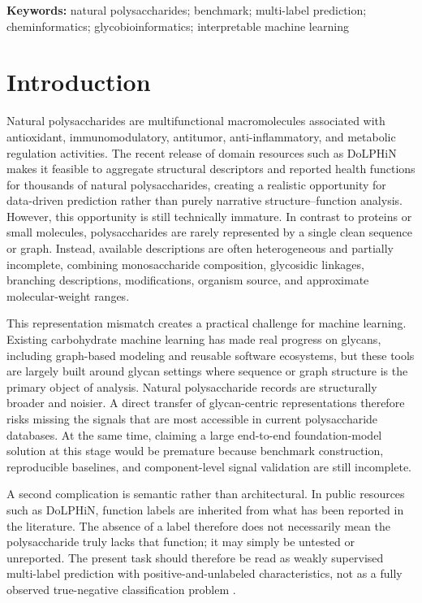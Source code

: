 \documentclass{article}
\begin{document}
\noindent\textbf{Keywords:} natural polysaccharides; benchmark; multi-label prediction; cheminformatics; glycobioinformatics; interpretable machine learning

\section{Introduction}
\label{sec:intro}

Natural polysaccharides are multifunctional macromolecules associated with antioxidant, immunomodulatory, antitumor, anti-inflammatory, and metabolic regulation activities. The recent release of domain resources such as DoLPHiN makes it feasible to aggregate structural descriptors and reported health functions for thousands of natural polysaccharides, creating a realistic opportunity for data-driven prediction rather than purely narrative structure--function analysis. However, this opportunity is still technically immature. In contrast to proteins or small molecules, polysaccharides are rarely represented by a single clean sequence or graph. Instead, available descriptions are often heterogeneous and partially incomplete, combining monosaccharide composition, glycosidic linkages, branching descriptions, modifications, organism source, and approximate molecular-weight ranges.

This representation mismatch creates a practical challenge for machine learning. Existing carbohydrate machine learning has made real progress on glycans, including graph-based modeling and reusable software ecosystems, but these tools are largely built around glycan settings where sequence or graph structure is the primary object of analysis. Natural polysaccharide records are structurally broader and noisier. A direct transfer of glycan-centric representations therefore risks missing the signals that are most accessible in current polysaccharide databases. At the same time, claiming a large end-to-end foundation-model solution at this stage would be premature because benchmark construction, reproducible baselines, and component-level signal validation are still incomplete.

A second complication is semantic rather than architectural. In public resources such as DoLPHiN, function labels are inherited from what has been reported in the literature. The absence of a label therefore does not necessarily mean the polysaccharide truly lacks that function; it may simply be untested or unreported. The present task should therefore be read as weakly supervised multi-label prediction with positive-and-unlabeled characteristics, not as a fully observed true-negative classification problem \cite{jain2016weaklysupervised,li2022pu}.
\end{document}
